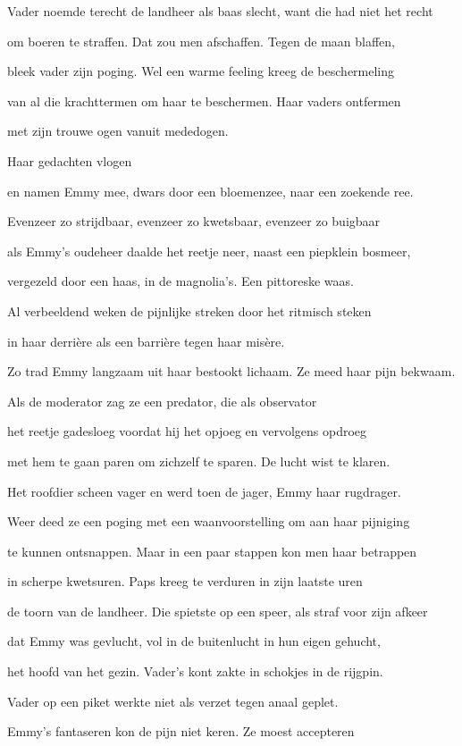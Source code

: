 Vader noemde terecht
de landheer als baas slecht,
want die had niet het recht

om boeren te straffen.
Dat zou men afschaffen.
Tegen de maan blaffen,

bleek vader zijn poging.
Wel een warme feeling
kreeg de beschermeling

van al die krachttermen
om haar te beschermen.
Haar vaders ontfermen

met zijn trouwe ogen
vanuit mededogen.

Haar gedachten vlogen

en namen Emmy mee,
dwars door een bloemenzee,
naar een zoekende ree.

Evenzeer zo strijdbaar,
evenzeer zo kwetsbaar,
evenzeer zo buigbaar

als Emmy’s oudeheer
daalde het reetje neer,
naast een piepklein bosmeer,

vergezeld door een haas,
in de magnolia's.
Een pittoreske waas.

Al verbeeldend weken
de pijnlijke streken
door het ritmisch steken

in haar derrière
als een barrière
tegen haar misère.

Zo trad Emmy langzaam
uit haar bestookt lichaam.
Ze meed haar pijn bekwaam.

Als de moderator
zag ze een predator,
die als observator

het reetje gadesloeg
voordat hij het opjoeg
en vervolgens opdroeg

met hem te gaan paren
om zichzelf te sparen.
De lucht wist te klaren.

Het roofdier scheen vager
en werd toen de jager,
Emmy haar rugdrager.

Weer deed ze een poging
met een waanvoorstelling
om aan haar pijniging

te kunnen ontsnappen.
Maar in een paar stappen
kon men haar betrappen

in scherpe kwetsuren.
Paps kreeg te verduren
in zijn laatste uren

de toorn van de landheer.
Die spietste op een speer,
als straf voor zijn afkeer

dat Emmy was gevlucht,
vol in de buitenlucht
in hun eigen gehucht,

het hoofd van het gezin.
Vader’s kont zakte in
schokjes in de rijgpin.

Vader op een piket
werkte niet als verzet
tegen anaal geplet.

Emmy’s fantaseren
kon de pijn niet keren.
Ze moest accepteren

